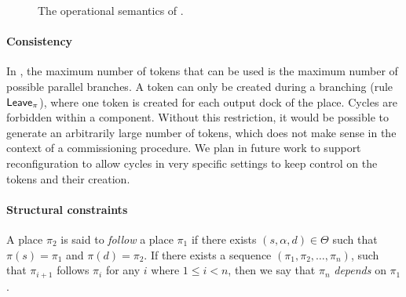 {\begin{figure}[tp]
  \caption{The operational semantics of \mad.}
  \label{fig:rules}
\end{figure}


\paragraph{Consistency}{
  In \mad, the maximum number of tokens that can be used is the
  maximum number of possible parallel branches. A token can only be
  created during a branching (rule $\mathsf{Leave}_\pi$), where one token is
  created for each output dock of the place. Cycles are forbidden
  within a \mad component. Without this restriction, it would be
  possible to generate an arbitrarily large number of tokens, which
  does not make sense in the context of a commissioning procedure. We
  plan in future work to support reconfiguration to allow cycles in
  very specific settings to keep control on the tokens and their
  creation.
}


\paragraph{Structural constraints}{
  A place $\pi_2$ is said to \emph{follow} a place $\pi_1$ if there
  exists $(s, \alpha, d) \in \Theta$ such that $\pi(s) = \pi_1$ and
  $\pi(d) = \pi_2$.  If there exists a sequence $(\pi_1, \pi_2, \dots,
  \pi_n)$, such that $\pi_{i+1}$ follows $\pi_i$ for any $i$ where $1
  \le i < n$, then we say that $\pi_n$ \emph{depends} on $\pi_1$.

}}
